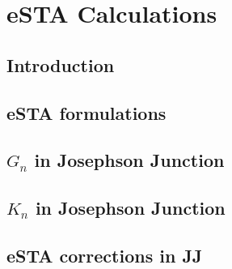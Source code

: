 
\section{eSTA Calculations}

\subsection{Introduction} %


\subsection{eSTA formulations} %


\subsection{$ G_{n} $ in Josephson Junction}


\subsection{$ K_{n} $ in Josephson Junction}


\subsection{eSTA corrections in JJ} %
%
